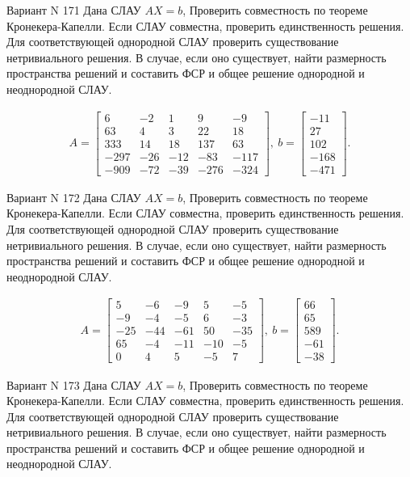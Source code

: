 \documentclass[11pt]{report}
\begin{document}
Вариант N 171
Дана СЛАУ $AX = b$,
Проверить совместность по теореме Кронекера-Капелли. Если СЛАУ совместна, проверить единственность решения.
Для соответствующей однородной СЛАУ проверить существование нетривиального решения. В случае, если оно существует,
найти размерность пространства решений и составить ФСР и общее решение однородной  и неоднородной СЛАУ.


\begin{align*}
 A = \left[\begin{matrix}6 & -2 & 1 & 9 & -9\\63 & 4 & 3 & 22 & 18\\333 & 14 & 18 & 137 & 63\\-297 & -26 & -12 & -83 & -117\\-909 & -72 & -39 & -276 & -324\end{matrix}\right],
\ b = \left[\begin{matrix}-11\\27\\102\\-168\\-471\end{matrix}\right]. 
 \end{align*}

Вариант N 172
Дана СЛАУ $AX = b$,
Проверить совместность по теореме Кронекера-Капелли. Если СЛАУ совместна, проверить единственность решения.
Для соответствующей однородной СЛАУ проверить существование нетривиального решения. В случае, если оно существует,
найти размерность пространства решений и составить ФСР и общее решение однородной  и неоднородной СЛАУ.


\begin{align*}
 A = \left[\begin{matrix}5 & -6 & -9 & 5 & -5\\-9 & -4 & -5 & 6 & -3\\-25 & -44 & -61 & 50 & -35\\65 & -4 & -11 & -10 & -5\\0 & 4 & 5 & -5 & 7\end{matrix}\right],
\ b = \left[\begin{matrix}66\\65\\589\\-61\\-38\end{matrix}\right]. 
 \end{align*}

Вариант N 173
Дана СЛАУ $AX = b$,
Проверить совместность по теореме Кронекера-Капелли. Если СЛАУ совместна, проверить единственность решения.
Для соответствующей однородной СЛАУ проверить существование нетривиального решения. В случае, если оно существует,
найти размерность пространства решений и составить ФСР и общее решение однородной  и неоднородной СЛАУ.
\end{document}
